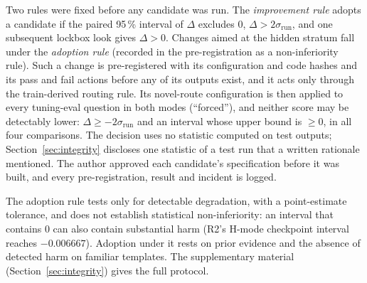 \documentclass[conference]{IEEEtran}
\begin{document}
Two rules were fixed before any candidate was run. The \emph{improvement rule} adopts a candidate if the paired 95\,\% interval of $\Delta$ excludes 0, $\Delta>2\sigma_{\mathrm{run}}$, and one subsequent lockbox look gives $\Delta>0$. Changes aimed at the hidden stratum fall under the \emph{adoption rule} (recorded in the pre-registration as a non-inferiority rule). Such a change is pre-registered with its configuration and code hashes and its pass and fail actions before any of its outputs exist, and it acts only through the train-derived routing rule. Its novel-route configuration is then applied to every tuning-eval question in both modes (``forced''), and neither score may be detectably lower: $\Delta\ge-2\sigma_{\mathrm{run}}$ and an interval whose upper bound is $\ge0$, in all four comparisons. The decision uses no statistic computed on test outputs; Section~\ref{sec:integrity} discloses one statistic of a test run that a written rationale mentioned. The author approved each candidate's specification before it was built, and every pre-registration, result and incident is logged.

The adoption rule tests only for detectable degradation, with a point-estimate tolerance, and does not establish statistical non-inferiority: an interval that contains 0 can also contain substantial harm (R2's H-mode checkpoint interval reaches $-0.006667$). Adoption under it rests on prior evidence and the absence of detected harm on familiar templates. The supplementary material (Section~\ref{sec:integrity}) gives the full protocol.
\end{document}
